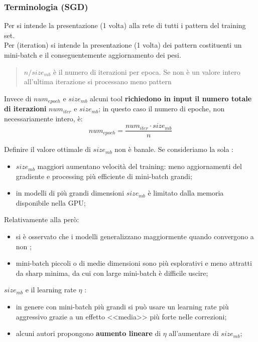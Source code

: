 \subsubsection{Terminologia (SGD)}\label{sec:terminologia_sgd_} %
Per  si intende la presentazione (1 volta) alla rete di tutti i pattern del training set.
\\
Per  (iteration) si intende la presentazione (1 volta) dei pattern costituenti un mini-batch e il conseguentemente aggiornamento dei pesi.
\begin{quote}
    $n/size_{mb}$ è il numero di iterazioni per epoca. Se non è un valore intero all'ultima iterazione si processano meno pattern
\end{quote}
Invece di $num_{epoch}$ e $size_{mb}$ alcuni tool \textbf{richiedono in input il numero totale di iterazioni} $num_{iter}$ e $size_{mb}$; in questo caso il numero di epoche, non necessariamente intero, è:
\[
    num_{epoch} = \frac{num_{iter}\cdot size_{mb}}{n}
\]
\begin{note}
    Definire il valore ottimale di $size_{mb}$ non è banale. 
    Se consideriamo la sola :
    \begin{itemize}
        \item $size_{mb}$ maggiori aumentano velocità del training: meno aggiornamenti del gradiente e processing più efficiente di mini-batch grandi;
        \item in modelli di più grandi dimensioni $size_{mb}$ è limitato dalla memoria disponibile nella GPU;
    \end{itemize}
    Relativamente alla  però:
    \begin{itemize}
        \item si è osservato che i modelli generalizzano maggiormente quando convergono a  non ;
        \item mini-batch piccoli o di medie dimensioni sono più esplorativi e meno attratti da sharp minima, da cui con large mini-batch è difficile uscire;
    \end{itemize}
    $size_{mb}$ e il learning rate $\eta$ :
    \begin{itemize}
        \item in genere con mini-batch più grandi si può usare un learning rate più aggressivo grazie a un effetto <<media>> più forte nelle correzioni;
        \item alcuni autori propongono \textbf{aumento lineare} di $\eta$ all'aumentare di $size_{mb}$;
    \end{itemize}
\end{note}
%
